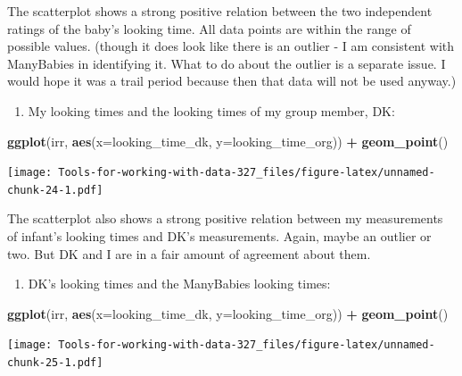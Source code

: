\documentclass[
]{book}
\newenvironment{Shaded}{\begin{snugshade}}{\end{snugshade}}
\newcommand{\DataTypeTok}[1]{\textcolor[rgb]{0.13,0.29,0.53}{#1}}
\newcommand{\KeywordTok}[1]{\textcolor[rgb]{0.13,0.29,0.53}{\textbf{#1}}}
\newcommand{\NormalTok}[1]{#1}
\newcommand{\OperatorTok}[1]{\textcolor[rgb]{0.81,0.36,0.00}{\textbf{#1}}}
\newcommand{\StringTok}[1]{\textcolor[rgb]{0.31,0.60,0.02}{#1}}
\providecommand{\tightlist}{%
  \setlength{\itemsep}{0pt}\setlength{\parskip}{0pt}}
\begin{document}
The scatterplot shows a strong positive relation between the two independent ratings of the baby's looking time. All data points are within the range of possible values. (though it does look like there is an outlier - I am consistent with ManyBabies in identifying it. What to do about the outlier is a separate issue. I would hope it was a trail period because then that data will not be used anyway.)

\begin{enumerate}
\def\labelenumi{\arabic{enumi}.}
\setcounter{enumi}{1}
\tightlist
\item
  My looking times and the looking times of my group member, DK:
\end{enumerate}

\begin{Shaded}
\begin{Highlighting}[]
\KeywordTok{ggplot}\NormalTok{(irr, }\KeywordTok{aes}\NormalTok{(}\DataTypeTok{x=}\NormalTok{looking_time_dk, }\DataTypeTok{y=}\NormalTok{looking_time_org)) }\OperatorTok{+}
\StringTok{  }\KeywordTok{geom_point}\NormalTok{()}
\end{Highlighting}
\end{Shaded}

\texttt{[image: Tools-for-working-with-data-327\_files/figure-latex/unnamed-chunk-24-1.pdf]}

The scatterplot also shows a strong positive relation between my measurements of infant's looking times and DK's measurements. Again, maybe an outlier or two. But DK and I are in a fair amount of agreement about them.

\begin{enumerate}
\def\labelenumi{\arabic{enumi}.}
\setcounter{enumi}{2}
\tightlist
\item
  DK's looking times and the ManyBabies looking times:
\end{enumerate}

\begin{Shaded}
\begin{Highlighting}[]
\KeywordTok{ggplot}\NormalTok{(irr, }\KeywordTok{aes}\NormalTok{(}\DataTypeTok{x=}\NormalTok{looking_time_dk, }\DataTypeTok{y=}\NormalTok{looking_time_org)) }\OperatorTok{+}
\StringTok{  }\KeywordTok{geom_point}\NormalTok{()}
\end{Highlighting}
\end{Shaded}

\texttt{[image: Tools-for-working-with-data-327\_files/figure-latex/unnamed-chunk-25-1.pdf]}
\end{document}
